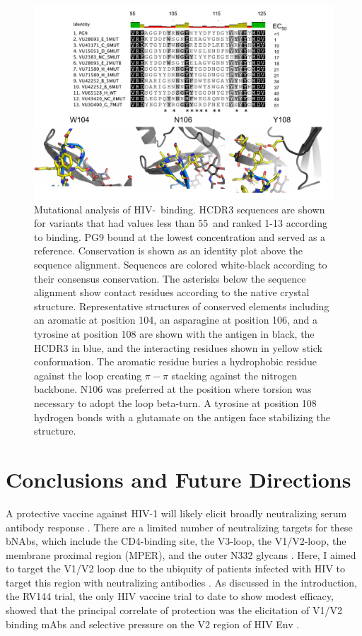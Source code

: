 \begin{figure}[!t]
   \centering
   \includegraphics[width=.99\linewidth]{images/chapter3/figure3_18.pdf} %
   \caption[Mutational Analysis of HIV-\naive~Binding]{Mutational analysis of HIV-\naive~binding. HCDR3 sequences are shown for variants that had \ec values less than 55\mcml~and ranked 1-13 according to binding. PG9 bound at the lowest concentration and served as a reference. Conservation is shown as an identity plot above the sequence alignment. Sequences are colored white-black according to their consensus conservation. The asterisks below the sequence alignment show contact residues according to the native crystal structure. Representative structures of conserved elements including an aromatic at position 104, an asparagine at position 106, and a tyrosine at position 108 are shown with the antigen in black, the HCDR3 in blue, and the interacting residues shown in yellow stick conformation. The aromatic residue buries a hydrophobic residue against the loop creating $\pi-\pi$ stacking against the nitrogen backbone. N106 was preferred at the position where torsion was necessary to adopt the loop beta-turn. A tyrosine at position 108 hydrogen bonds with a glutamate on the antigen face stabilizing the structure.}
   \label{fig:figure3_18}
\end{figure}

\section{Conclusions and Future Directions}
A protective vaccine against HIV-1 will likely elicit broadly neutralizing serum antibody response \citep{Mascola:1999wk,Burton:2012bh,Hessell:2009ig,Hessell:2010kq,Hessell:2009fy,Hessell:2012kq}. There are a limited number of neutralizing targets for these bNAbs, which include the CD4-binding site, the V3-loop, the V1/V2-loop, the membrane proximal region (MPER), and the outer N332 glycans \citep{Walker:2010bm}. Here, I aimed to target the V1/V2 loop due to the ubiquity of patients infected with HIV to target this region with neutralizing antibodies \citep{Walker:2010bm,Gray:2009jw,Lynch:2011ea,Georgiev:2013kd}. As discussed in the introduction, the RV144 trial, the only HIV vaccine trial to date to show modest efficacy, showed that the principal correlate of protection was the elicitation of V1/V2 binding mAbs and selective pressure on the V2 region of HIV Env \citep{Rolland:2012iz,Haynes:2012ka}.

